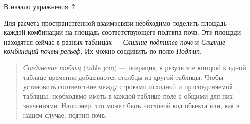 \documentclass[]{book}
\theoremstyle{definition}
\theoremstyle{definition}
\theoremstyle{definition}
\theoremstyle{remark}
\begin{document}
\protect\hyperlink{overlay}{В начало упражнения ⇡}

Для расчета пространственной взаимосвязи необходимо поделить площадь
каждой комбинации на площадь соответствующего подтипа почв. Эти площади
находятся сейчас в разных таблицах --- \emph{Слияние подтипов почв} и
\emph{Слияние комбинаций почвы-рельеф}. Их можно соединить по полю
\emph{Подтип}.

\begin{quote}
\emph{Соединение таблиц} (table join) --- операция, в результате которой
к одной таблице временно добавляются столбцы из другой таблицы. Чтобы
установить соответствие между строками исходной и присоединяемой
таблицы, необходимо иметь в каждой таблице поле с общими для них
значениями. Например, это может быть числовой код объекта или, как в
нашем случае, подтип почв.
\end{quote}
\end{document}

